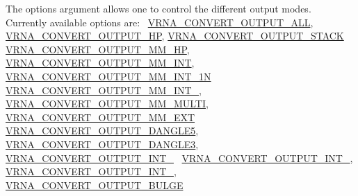 The options argument allows one to control the different output modes.~\newline
Currently available options are\+:~\newline
\hyperlink{group__energy__parameters__convert_ga8dc6aee5a806c49b71557152f9616bc4}{V\+R\+N\+A\+\_\+\+C\+O\+N\+V\+E\+R\+T\+\_\+\+O\+U\+T\+P\+U\+T\+\_\+\+A\+LL}, \hyperlink{group__energy__parameters__convert_gaf66fe2cb11dfcfd32d791049c254a8a4}{V\+R\+N\+A\+\_\+\+C\+O\+N\+V\+E\+R\+T\+\_\+\+O\+U\+T\+P\+U\+T\+\_\+\+HP}, \hyperlink{group__energy__parameters__convert_gad23522d63f8d4c50d5a5deee9bee3ef2}{V\+R\+N\+A\+\_\+\+C\+O\+N\+V\+E\+R\+T\+\_\+\+O\+U\+T\+P\+U\+T\+\_\+\+S\+T\+A\+CK}~\newline
\hyperlink{group__energy__parameters__convert_gaa892c7b4957459090f3e08da298cc347}{V\+R\+N\+A\+\_\+\+C\+O\+N\+V\+E\+R\+T\+\_\+\+O\+U\+T\+P\+U\+T\+\_\+\+M\+M\+\_\+\+HP}, \hyperlink{group__energy__parameters__convert_ga4ff223fb1f9c62cd92d9ab811ad03d55}{V\+R\+N\+A\+\_\+\+C\+O\+N\+V\+E\+R\+T\+\_\+\+O\+U\+T\+P\+U\+T\+\_\+\+M\+M\+\_\+\+I\+NT}, \hyperlink{group__energy__parameters__convert_gaf5d3743219f83c6348155cd81e755bbb}{V\+R\+N\+A\+\_\+\+C\+O\+N\+V\+E\+R\+T\+\_\+\+O\+U\+T\+P\+U\+T\+\_\+\+M\+M\+\_\+\+I\+N\+T\+\_\+1N}~\newline
\hyperlink{group__energy__parameters__convert_ga78382ec622ba99e0ac2262317bdd7316}{V\+R\+N\+A\+\_\+\+C\+O\+N\+V\+E\+R\+T\+\_\+\+O\+U\+T\+P\+U\+T\+\_\+\+M\+M\+\_\+\+I\+N\+T\+\_}, \hyperlink{group__energy__parameters__convert_gae67af9f1cdf7baf2865481282a5d1034}{V\+R\+N\+A\+\_\+\+C\+O\+N\+V\+E\+R\+T\+\_\+\+O\+U\+T\+P\+U\+T\+\_\+\+M\+M\+\_\+\+M\+U\+L\+TI}, \hyperlink{group__energy__parameters__convert_gaf14ead7ef1fdbe725ade653750fc51e3}{V\+R\+N\+A\+\_\+\+C\+O\+N\+V\+E\+R\+T\+\_\+\+O\+U\+T\+P\+U\+T\+\_\+\+M\+M\+\_\+\+E\+XT}~\newline
\hyperlink{group__energy__parameters__convert_ga036ffd996d8c8a9acf631760dd1da24b}{V\+R\+N\+A\+\_\+\+C\+O\+N\+V\+E\+R\+T\+\_\+\+O\+U\+T\+P\+U\+T\+\_\+\+D\+A\+N\+G\+L\+E5}, \hyperlink{group__energy__parameters__convert_ga34a8a5479ef885834ef32f3fb43d79bc}{V\+R\+N\+A\+\_\+\+C\+O\+N\+V\+E\+R\+T\+\_\+\+O\+U\+T\+P\+U\+T\+\_\+\+D\+A\+N\+G\+L\+E3}, \hyperlink{group__energy__parameters__convert_ga079aafefd5f8ab57ee5120099a34bd25}{V\+R\+N\+A\+\_\+\+C\+O\+N\+V\+E\+R\+T\+\_\+\+O\+U\+T\+P\+U\+T\+\_\+\+I\+N\+T\+\_}~\newline
\hyperlink{group__energy__parameters__convert_gacf770881d9034431ebe741642342a1f9}{V\+R\+N\+A\+\_\+\+C\+O\+N\+V\+E\+R\+T\+\_\+\+O\+U\+T\+P\+U\+T\+\_\+\+I\+N\+T\+\_}, \hyperlink{group__energy__parameters__convert_gaa307671e2631cdacad9cbe4c6583b05f}{V\+R\+N\+A\+\_\+\+C\+O\+N\+V\+E\+R\+T\+\_\+\+O\+U\+T\+P\+U\+T\+\_\+\+I\+N\+T\+\_}, \hyperlink{group__energy__parameters__convert_ga7092fe0be4de6f02cc0bf08e81af726a}{V\+R\+N\+A\+\_\+\+C\+O\+N\+V\+E\+R\+T\+\_\+\+O\+U\+T\+P\+U\+T\+\_\+\+B\+U\+L\+GE}~\newline
